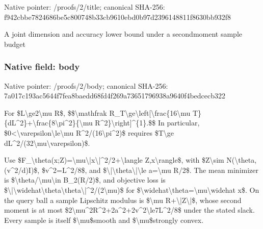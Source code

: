 \documentclass[10pt,a4paper]{article}
\begin{document}
Native pointer: /proofs/2/title; canonical SHA-256: f942cbbe7824686be5c80074\allowbreak{}8b33cb9610ebd0b97d239614\allowbreak{}8811f8630bb932f8


A joint dimension and accuracy lower bound under a secondmoment sample budget


\subsubsection{Native field: body}


Native pointer: /proofs/2/body; canonical SHA-256: 7a017c193ac5644f7fea8bae\allowbreak{}dd68fd4f269a73651796938a\allowbreak{}9640f4bedcecb322


For \$L\textbackslash{}ge2\textbackslash{}mu R\$,
\$\$\textbackslash{}mathfrak R\_T\textbackslash{}ge\textbackslash{}left[\textbackslash{}frac\{16\textbackslash{}mu T\}\{dL\textasciicircum{}2\}+\textbackslash{}frac\{8\textbackslash{}pi\textasciicircum{}2\}\{\textbackslash{}mu R\textasciicircum{}2\}\textbackslash{}right]\textasciicircum{}\{1\}.\$\$
In particular, \$0<\textbackslash{}varepsilon\textbackslash{}le\textbackslash{}mu R\textasciicircum{}2/(16\textbackslash{}pi\textasciicircum{}2)\$ requires \$T\textbackslash{}ge dL\textasciicircum{}2/(32\textbackslash{}mu\textbackslash{}varepsilon)\$.

Use \$F\_\textbackslash{}theta(x;Z)=\textbackslash{}mu\textbackslash{}|x\textbackslash{}|\textasciicircum{}2/2+\textbackslash{}langle Z,x\textbackslash{}rangle\$, with \$Z\textbackslash{}sim N(\textbackslash{}theta,(v\textasciicircum{}2/d)I)\$, \$v\textasciicircum{}2=L\textasciicircum{}2/8\$, and \$\textbackslash{}|\textbackslash{}theta\textbackslash{}|\textbackslash{}le a=\textbackslash{}mu R/2\$. The mean minimizer is \$\textbackslash{}theta/\textbackslash{}mu\textbackslash{}in B\_2(R/2)\$, and objective loss is \$\textbackslash{}|\textbackslash{}widehat\textbackslash{}theta\textbackslash{}theta\textbackslash{}|\textasciicircum{}2/(2\textbackslash{}mu)\$ for \$\textbackslash{}widehat\textbackslash{}theta=\textbackslash{}mu\textbackslash{}widehat x\$. On the query ball a sample Lipschitz modulus is \$\textbackslash{}mu R+\textbackslash{}|Z\textbackslash{}|\$, whose second moment is at most \$2\textbackslash{}mu\textasciicircum{}2R\textasciicircum{}2+2a\textasciicircum{}2+2v\textasciicircum{}2\textbackslash{}le7L\textasciicircum{}2/8\$ under the stated slack. Every sample is itself \$\textbackslash{}mu\$smooth and \$\textbackslash{}mu\$strongly convex.
\end{document}
